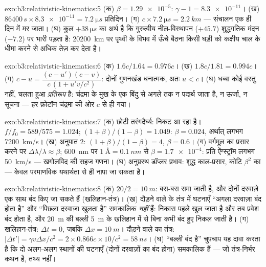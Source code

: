 \begin{solution}{exo:b3:relativistic-kinematics:5}
(क) $\beta = \num{1.29e-5}$: $\gamma - 1 = \num{8.3e-11}$। (ख)
$86400\,\unit{s} \times \num{8.3e-11} = \qty{7.2}{\micro s}$ प्रतिदिन।
(ग) $c \times \qty{7.2}{\micro s} = \qty{2.2}{km}$ --- संचालन
एक ही दिन में मर जाता। (घ) कुल $+38\,\unit{\micro s}$ का अर्थ है कि
गुरुत्वीय नील-विस्थापन ($+45.7$) शुद्धगतिक मंदन ($-7.2$) पर भारी पड़ता
है: \qty{20200}{km} पर पृथ्वी के विभव में ऊँचे बैठना
किसी घड़ी को कक्षीय चाल के धीमा करने से अधिक तेज़ कर देता है।
\end{solution}

\begin{solution}{exo:b3:relativistic-kinematics:6}
(क) $1.6c/1.64 = 0.976c$। (ख) $1.8c/1.81 = 0.994c$। (ग) $c - u =
\dfrac{(c - u')(c - v)}{c\,(1 + u'v/c^2)}$: दोनों गुणनखंड धनात्मक, अतः
$u < c$। (घ) धब्बा कोई वस्तु नहीं, चलता हुआ \emph{प्रतिरूप} है: चंद्रमा
के मुख के एक बिंदु से अगले तक न पदार्थ जाता है, न ऊर्जा, न सूचना ---
हर फ़ोटॉन चंद्रमा की ओर $c$ से ही गया।
\end{solution}

\begin{solution}{exo:b3:relativistic-kinematics:7}
(क) छोटी तरंगदैर्घ्य: निकट आ रहा है। $f/f_0 = 589/575 = 1.024$;
$(1+\beta)/(1-\beta) = 1.049$: $\beta = 0.024$, अर्थात् लगभग
\qty{7200}{km/s}। (ख) अनुपात $2$: $(1+\beta)/(1-\beta) = 4$, $\beta =
0.6$। (ग) वर्गमूल का प्रसार करने पर $\Delta\lambda/\lambda \approx
\beta$; \qty{600}{nm} पर $\qty{1}{\angstrom} = \qty{0.1}{nm}$ से
$\beta = \num{1.7e-4}$: प्रति ऐंग्स्ट्रॉम लगभग \qty{50}{km/s} ---
खगोलविद की सहज गणना। (घ) अनुप्रस्थ डॉप्लर प्रभाव: शुद्ध
काल-प्रसार, कोटि $\beta^2$ का --- केवल परमाणविक
यथार्थता से ही नापा जा सकता है।
\end{solution}

\begin{solution}{exo:b3:relativistic-kinematics:8}
(क) $20/2 = \qty{10}{m}$: बस-बस समा जाती है, और दोनों दरवाज़े एक साथ
बंद किए जा सकते हैं (खलिहान-तंत्र)। (ख) दौड़ने वाले के तंत्र में घटनाएँ
``अगला दरवाज़ा बंद होता है'' और ``पिछला दरवाज़ा खुलता है'' समकालिक
\emph{नहीं} हैं: निकास पहले खुल जाता है और तब प्रवेश बंद होता है, और
\qty{20}{m} की बल्ली \qty{5}{m} के खलिहान में से बिना कभी बंद हुए
निकल जाती है। (ग) खलिहान-तंत्र: $\Delta t = 0$, जबकि $\Delta x =
\qty{10}{m}$। दौड़ने वाले का तंत्र: $|\Delta t'| = \gamma v\Delta x/c^2 =
2 \times 0.866c \times 10/c^2 = \qty{58}{ns}$। (घ) ``बल्ली बंद है''
चुपचाप यह दावा करता है कि दो अलग-अलग स्थानों की घटनाएँ (दोनों दरवाज़ों
का बंद होना) समकालिक हैं --- जो तंत्र-निर्भर कथन है, तथ्य नहीं।
\end{solution}

